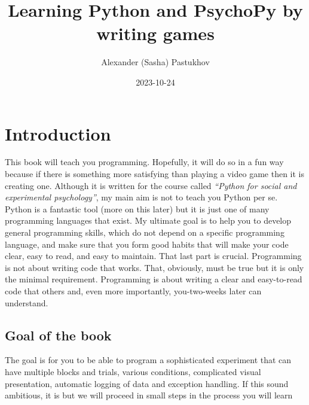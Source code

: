 \documentclass[
]{book}
\title{Learning Python and PsychoPy by writing games}
\author{Alexander (Sasha) Pastukhov}
\date{2023-10-24}
\begin{document}
\maketitle

{
\setcounter{tocdepth}{1}
\tableofcontents
}
\hypertarget{intro}{%
\chapter{Introduction}\label{intro}}

This book will teach you programming. Hopefully, it will do so in a fun way because if there is something more satisfying than playing a video game then it is creating one. Although it is written for the course called \emph{``Python for social and experimental psychology''}, my main aim is not to teach you Python per se. Python is a fantastic tool (more on this later) but it is just one of many programming languages that exist. My ultimate goal is to help you to develop general programming skills, which do not depend on a specific programming language, and make sure that you form good habits that will make your code clear, easy to read, and easy to maintain. That last part is crucial. Programming is not about writing code that works. That, obviously, must be true but it is only the minimal requirement. Programming is about writing a clear and easy-to-read code that others and, even more importantly, you-two-weeks later can understand.

\hypertarget{goal-of-the-book}{%
\section{Goal of the book}\label{goal-of-the-book}}

The goal is for you to be able to program a sophisticated experiment that can have multiple blocks and trials, various conditions, complicated visual presentation, automatic logging of data and exception handling. If this sound ambitious, it is but we will proceed in small steps in the process you will learn
\end{document}
